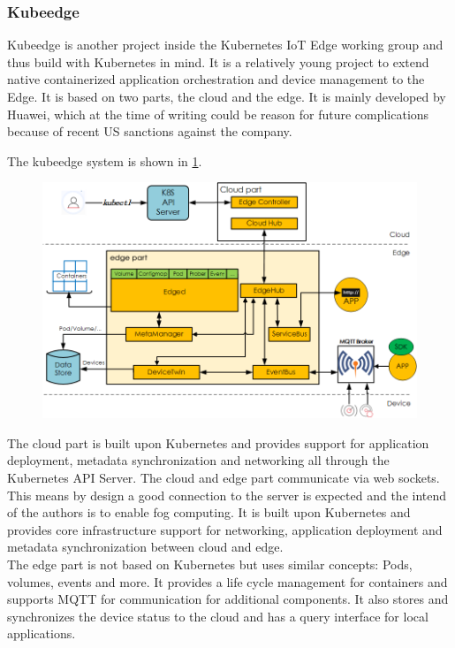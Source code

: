\subsubsection{Kubeedge}
Kubeedge is another project inside the Kubernetes IoT Edge working group and thus build with Kubernetes in mind. It is a relatively young project to extend native containerized application orchestration and device management to the Edge. It is based on two parts, the cloud and the edge. It is mainly developed by Huawei, which at the time of writing could be reason for future complications because of recent US sanctions against the company.

The kubeedge system is shown in \cref{fig:kubeedgeStruct}.
\begin{figure}[!ht]
    \centering
    \includegraphics[width=\textwidth-1cm]{figures/kubeedge_arch.png}
    \label{fig:kubeedgeStruct}
\end{figure}
The cloud part is built upon Kubernetes and provides support for application deployment, metadata synchronization and networking all through the Kubernetes API Server. The cloud and edge part communicate via web sockets. This means by design a good connection to the server is expected and the intend of the authors is to enable fog computing. It is built upon Kubernetes and provides core infrastructure support for networking, application deployment and metadata synchronization between cloud and edge.\\
The edge part is not based on Kubernetes but uses similar concepts: Pods, volumes, events and more. It provides a life cycle management for containers and supports MQTT for communication for additional components. It also stores and synchronizes the device status to the cloud and has a query interface for local applications.

